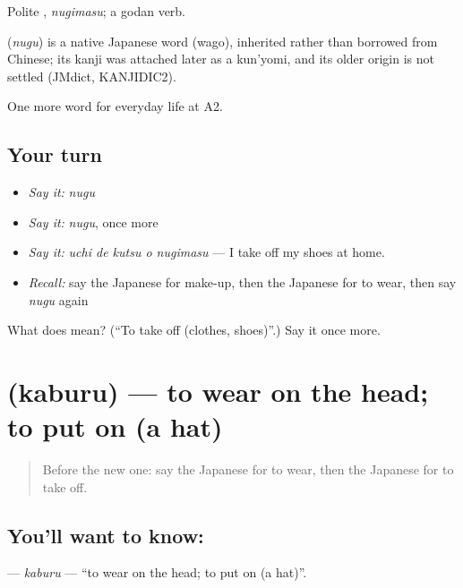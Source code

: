 Polite \textbf{}, \emph{nugimasu}; a godan verb.

\begin{cousinweb}
\textbf{} (\emph{nugu}) is a native Japanese word (wago), inherited rather than borrowed from Chinese; its kanji was attached later as a kun'yomi, and its older origin is not settled (JMdict, KANJIDIC2).
\end{cousinweb}

\begin{grammarlens}[title={What you've built}]
One more word for everyday life at A2.
\end{grammarlens}

\subsection*{Your turn}
\begin{itemize}
\raggedright
  \item \emph{Say it:} \emph{nugu}
  \item \emph{Say it:} \emph{nugu}, once more
  \item \emph{Say it:} \emph{uchi de kutsu o nugimasu} — I take off my shoes at home.
  \item \emph{Recall:} say the Japanese for make-up, then the Japanese for to wear, then say \emph{nugu} again
\end{itemize}

\begin{tcolorbox}[breakable,colback=teal!4,colframe=teal!35!black,title={Before you move on}]
What does  mean? (\textquotedblleft{}To take off (clothes, shoes)\textquotedblright{}.) Say it once more.
\end{tcolorbox}
\section[\texorpdfstring{\ja{かぶる} (kaburu)}{かぶる (kaburu)}]{ (kaburu) — to wear on the head; to put on (a hat)}

\label{lesson:JA-C149-kaburu}



\begin{quote}
Before the new one: say the Japanese for to wear, then the Japanese for to take off.
\end{quote}

\subsection*{You'll want to know: }
\textbf{} — \emph{kaburu} — \textquotedblleft{}to wear on the head; to put on (a hat)\textquotedblright{}.

